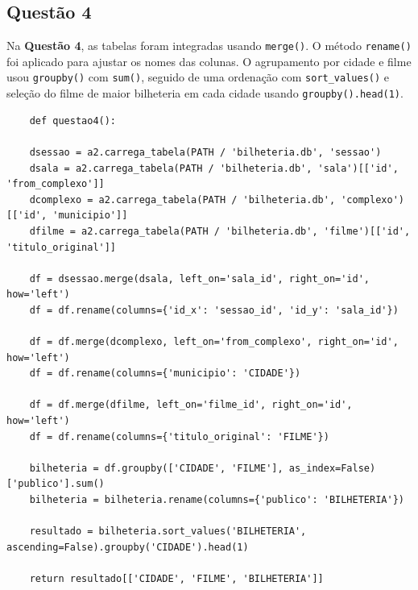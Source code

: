 \documentclass{article}
\begin{document}
\subsection*{Questão 4}
Na \textbf{Questão 4}, as tabelas foram integradas usando \texttt{merge()}. O método \texttt{rename()} foi aplicado para ajustar os nomes das colunas. O agrupamento por cidade e filme usou \texttt{groupby()} com \texttt{sum()}, seguido de uma ordenação com \texttt{sort\_values()} e seleção do filme de maior bilheteria em cada cidade usando \texttt{groupby().head(1)}.
\linespread{1}
\begin{lstlisting}
    def questao4():
    
    dsessao = a2.carrega_tabela(PATH / 'bilheteria.db', 'sessao')
    dsala = a2.carrega_tabela(PATH / 'bilheteria.db', 'sala')[['id', 'from_complexo']]
    dcomplexo = a2.carrega_tabela(PATH / 'bilheteria.db', 'complexo')[['id', 'municipio']]
    dfilme = a2.carrega_tabela(PATH / 'bilheteria.db', 'filme')[['id', 'titulo_original']]

    df = dsessao.merge(dsala, left_on='sala_id', right_on='id', how='left')
    df = df.rename(columns={'id_x': 'sessao_id', 'id_y': 'sala_id'})  

    df = df.merge(dcomplexo, left_on='from_complexo', right_on='id', how='left')
    df = df.rename(columns={'municipio': 'CIDADE'})
    
    df = df.merge(dfilme, left_on='filme_id', right_on='id', how='left')
    df = df.rename(columns={'titulo_original': 'FILME'})

    bilheteria = df.groupby(['CIDADE', 'FILME'], as_index=False)['publico'].sum()
    bilheteria = bilheteria.rename(columns={'publico': 'BILHETERIA'})

    resultado = bilheteria.sort_values('BILHETERIA', ascending=False).groupby('CIDADE').head(1)

    return resultado[['CIDADE', 'FILME', 'BILHETERIA']]

\end{lstlisting}
\end{document}
